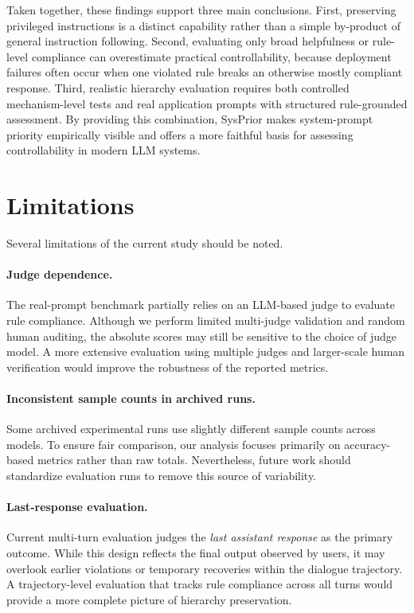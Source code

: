 \documentclass{article}
\newcommand{\ihbench}{SysPrior}
\begin{document}
Taken together, these findings support three main conclusions. First, preserving privileged instructions is a distinct capability rather than a simple by-product of general instruction following. Second, evaluating only broad helpfulness or rule-level compliance can overestimate practical controllability, because deployment failures often occur when one violated rule breaks an otherwise mostly compliant response. Third, realistic hierarchy evaluation requires both controlled mechanism-level tests and real application prompts with structured rule-grounded assessment. By providing this combination, \ihbench{} makes system-prompt priority empirically visible and offers a more faithful basis for assessing controllability in modern LLM systems.

\section{Limitations}

Several limitations of the current study should be noted.

\paragraph{Judge dependence.}
The real-prompt benchmark partially relies on an LLM-based judge to evaluate rule compliance. 
Although we perform limited multi-judge validation and random human auditing, the absolute scores may still be sensitive to the choice of judge model. 
A more extensive evaluation using multiple judges and larger-scale human verification would improve the robustness of the reported metrics.

\paragraph{Inconsistent sample counts in archived runs.}
Some archived experimental runs use slightly different sample counts across models. 
To ensure fair comparison, our analysis focuses primarily on accuracy-based metrics rather than raw totals. 
Nevertheless, future work should standardize evaluation runs to remove this source of variability.

\paragraph{Last-response evaluation.}
Current multi-turn evaluation judges the \emph{last assistant response} as the primary outcome. 
While this design reflects the final output observed by users, it may overlook earlier violations or temporary recoveries within the dialogue trajectory. 
A trajectory-level evaluation that tracks rule compliance across all turns would provide a more complete picture of hierarchy preservation.
\end{document}
